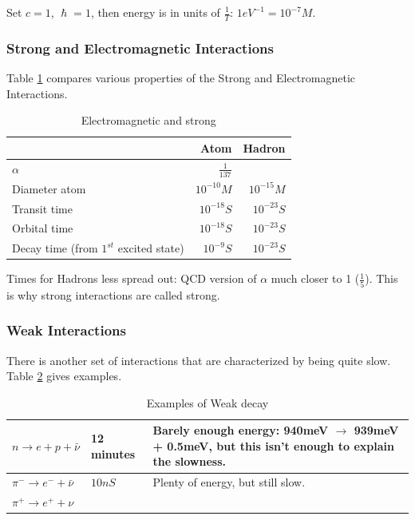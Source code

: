 \documentclass[]{article}
\begin{document}
Set $c=1$, $\hslash=1$, then energy is in units of $\frac{1}{T}$: $1eV^{-1}=10^{-7}M$.

\subsubsection{Strong and Electromagnetic Interactions}

Table \ref{table:ems} compares various properties of the Strong and Electromagnetic Interactions.

\begin{table}[H]
	\begin{center}
		\caption{Electromagnetic and strong}\label{table:ems}
		\begin{tabular}{|l|r|r|} \hline
			&Atom&Hadron \\ \hline
			$\alpha$&$\frac{1}{137}$&\\ \hline	
			Diameter atom&$10^{-10}M$&$10^{-15}M$ \\ \hline
			Transit time &$10^{-18}S$&$10^{-23}S$\\ \hline
			Orbital time &$10^{-18}S$&$10^{-23}S$\\ \hline
			Decay time (from $1^{st}$ excited state)&$10^{-9}S$&$10^{-23}S$\\ \hline
		\end{tabular}
	\end{center}
\end{table}

Times for Hadrons less spread out: QCD version of $\alpha$ much closer to 1 ($\frac{1}{5}$). This is why strong interactions are called strong.

\subsubsection{Weak Interactions}

There is another set of interactions that are characterized by being quite slow. Table \ref{table:ex:weak} gives examples.

\begin{table}[H]
	\begin{center}
		\caption{Examples of Weak decay}\label{table:ex:weak}
		\begin{tabular}{|l|l|p{6cm}|}\hline
			$n \rightarrow e + p +\bar{\nu}$&12 minutes&Barely enough energy: 940meV $\rightarrow$ 939meV + 0.5meV, but this isn't enough to explain the slowness.\\ \hline
			$\pi^- \rightarrow e^- + \bar{\nu} $&$10nS$&Plenty of energy, but still slow.\\ \hline
			$\pi^+ \rightarrow e^+ + \nu $&&\\ \hline
		\end{tabular}
	\end{center}
\end{table}
\end{document}
